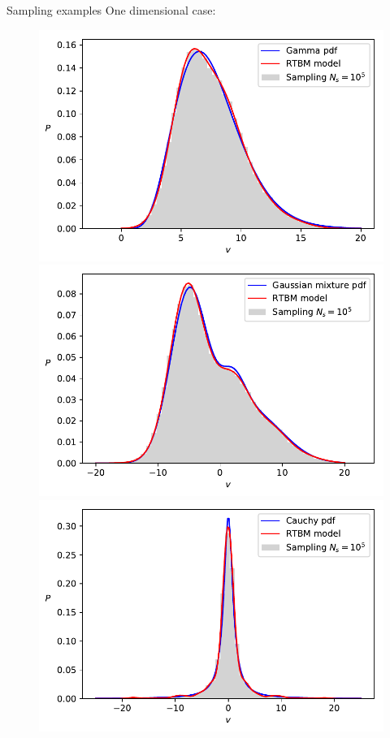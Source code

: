 \documentclass[10pt]{beamer}
\begin{document}
\begin{frame}{Sampling examples}
    One dimensional case:
    \begin{figure}[t!]
        \begin{center}
        \includegraphics[scale=0.30]{figures/gamma.pdf}
        \includegraphics[scale=0.30]{figures/gaussianmix.pdf}
        \includegraphics[scale=0.30]{figures/cauchy.pdf}



\end{center}
\end{figure}
\end{frame}
\end{document}
